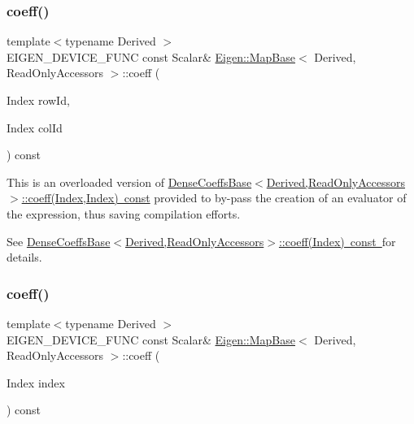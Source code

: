 \subsubsection{\texorpdfstring{coeff()}{coeff()}\hspace{0.1cm}{\footnotesize\ttfamily [1/2]}}
{\footnotesize\ttfamily template$<$typename Derived $>$ \\
E\+I\+G\+E\+N\+\_\+\+D\+E\+V\+I\+C\+E\+\_\+\+F\+U\+NC const Scalar\& \mbox{\hyperlink{class_eigen_1_1_map_base}{Eigen\+::\+Map\+Base}}$<$ Derived, Read\+Only\+Accessors $>$\+::coeff (\begin{DoxyParamCaption}\item[{Index}]{row\+Id,  }\item[{Index}]{col\+Id }\end{DoxyParamCaption}) const\hspace{0.3cm}{\ttfamily [inline]}}





This is an overloaded version of \mbox{\hyperlink{class_eigen_1_1_dense_coeffs_base_3_01_derived_00_01_read_only_accessors_01_4_ad41647ef695f9a5a58a9a0f50e2ae064}{Dense\+Coeffs\+Base$<$\+Derived,\+Read\+Only\+Accessors$>$\+::coeff(\+Index,\+Index) const}} provided to by-\/pass the creation of an evaluator of the expression, thus saving compilation efforts.

See \mbox{\hyperlink{class_eigen_1_1_dense_coeffs_base_3_01_derived_00_01_read_only_accessors_01_4_ad52344ad1f42852db71996590d2de0de}{Dense\+Coeffs\+Base$<$\+Derived,\+Read\+Only\+Accessors$>$\+::coeff(\+Index) const }}for details. \mbox{\label{class_eigen_1_1_map_base_3_01_derived_00_01_read_only_accessors_01_4_a3786c4aedbd29f75750bd434654b21f7}} 
\subsubsection{\texorpdfstring{coeff()}{coeff()}\hspace{0.1cm}{\footnotesize\ttfamily [2/2]}}
{\footnotesize\ttfamily template$<$typename Derived $>$ \\
E\+I\+G\+E\+N\+\_\+\+D\+E\+V\+I\+C\+E\+\_\+\+F\+U\+NC const Scalar\& \mbox{\hyperlink{class_eigen_1_1_map_base}{Eigen\+::\+Map\+Base}}$<$ Derived, Read\+Only\+Accessors $>$\+::coeff (\begin{DoxyParamCaption}\item[{Index}]{index }\end{DoxyParamCaption}) const\hspace{0.3cm}{\ttfamily [inline]}}





